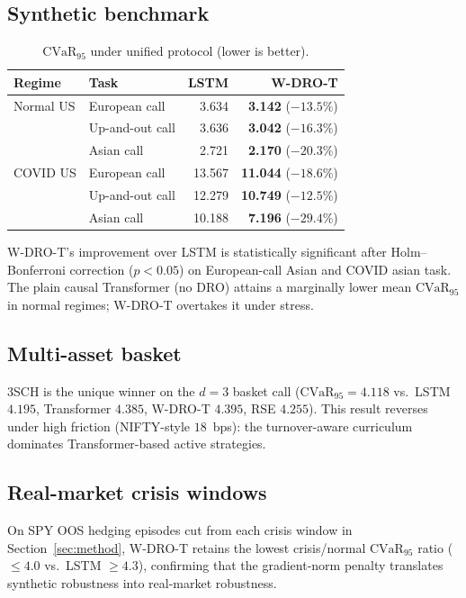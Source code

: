 \documentclass[10pt,twocolumn]{article}
\newcommand{\cvar}{\mathrm{CVaR}}
\begin{document}
\subsection{Synthetic benchmark}

\begin{table}[h]
\centering\scriptsize
\caption{$\cvar_{95}$ under unified protocol (lower is better).}
\label{tab:headline}
\begin{tabular}{llrr}
\toprule
Regime & Task & LSTM & W-DRO-T \\\midrule
Normal US & European call   & 3.634 & \textbf{3.142} ($-13.5\%$) \\
          & Up-and-out call & 3.636 & \textbf{3.042} ($-16.3\%$) \\
          & Asian call      & 2.721 & \textbf{2.170} ($-20.3\%$) \\\midrule
COVID US  & European call   & 13.567 & \textbf{11.044} ($-18.6\%$) \\
          & Up-and-out call & 12.279 & \textbf{10.749} ($-12.5\%$) \\
          & Asian call      & 10.188 & \textbf{7.196}  ($-29.4\%$) \\
\bottomrule
\end{tabular}
\end{table}

W-DRO-T's improvement over LSTM is statistically significant after
Holm--Bonferroni correction ($p<0.05$) on European-call Asian and COVID
asian task.  The plain causal Transformer (no DRO) attains a marginally
lower mean $\cvar_{95}$ in normal regimes; W-DRO-T overtakes it under
stress.

\subsection{Multi-asset basket}
3SCH is the unique winner on the $d=3$ basket call ($\cvar_{95}=4.118$ vs.\
LSTM $4.195$, Transformer $4.385$, W-DRO-T $4.395$, RSE $4.255$).  This
result reverses under high friction (NIFTY-style $18$~bps): the
turnover-aware curriculum dominates Transformer-based active strategies.

\subsection{Real-market crisis windows}

On SPY OOS hedging episodes cut from each crisis window in
Section~\ref{sec:method}, W-DRO-T retains the lowest crisis/normal
$\cvar_{95}$ ratio ($\le 4.0$ vs.\ LSTM $\ge 4.3$), confirming that the
gradient-norm penalty translates synthetic robustness into real-market
robustness.
\end{document}
